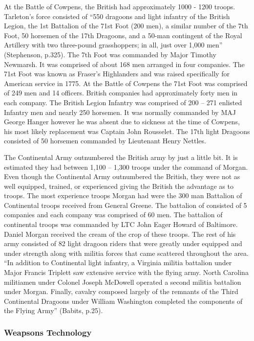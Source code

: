 At the Battle of Cowpens, the British had approximately 1000 - 1200 troops.
Tarleton’s force consisted of “550 dragoons and light infantry of the British
Legion, the 1st Battalion of the 71st Foot (200 men), a similar number of the
7th Foot, 50 horsemen of the 17th Dragoons, and a 50-man contingent of the Royal
Artillery with two three-pound grasshoppers; in all, just over 1,000 men”
(Stephenson, p.325).  The 7th Foot was commanded by Major Timothy Newmarsh.  It
was comprised of about 168 men arranged in four companies.  The 71st Foot was
known as Fraser’s Highlanders and was raised specifically for American service
in 1775.  At the Battle of Cowpens the 71st Foot was comprised of 249 men and 14
officers.  British companies had approximately forty men in each company.  The
British Legion Infantry was comprised of 200 – 271 enlisted Infantry men and
nearly 250 horsemen. It was normally commanded by MAJ George Hanger however he
was absent due to sickness at the time of Cowpens, his most likely replacement
was Captain John Rousselet.  The 17th light Dragoons consisted of 50 horsemen
commanded by Lieutenant Henry Nettles.        

The   Continental Army outnumbered the British army by just a little bit.  It is
estimated they had between 1,100 – 1,300 troops under the command of Morgan.
Even though the Continental Army outnumbered the British, they were not as well
equipped, trained, or experienced giving the British the advantage as to troops.
The most experience troops Morgan had were the 300 man Battalion of Continental
troops received from General Greene.  The battalion of consisted of 5 companies
and each company was comprised of 60 men.  The battalion of continental troops
was commanded by LTC John Eager Howard of Baltimore.  Daniel Morgan received the
cream of the crop of these troops.  The rest of his army consisted of 82 light
dragoon riders that were greatly under equipped and under strength along with
militia forces that came scattered throughout the area.  “In addition to
Continental light infantry, a Virginia militia battalion under Major Francis
Triplett saw extensive service with the flying army.  North Carolina militiamen
under Colonel Joseph McDowell operated a second militia battalion under Morgan.
Finally, cavalry composed largely of the remnants of the Third Continental
Dragoons under William Washington completed the components of the Flying Army”
(Babits, p.25).

\subsubsection{Weapsons Technology}


